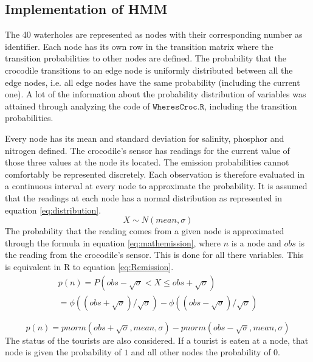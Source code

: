 \documentclass[12pt, a4paper]{article}
\begin{document}
\subsection{Implementation of HMM}\label{seq:implementation}

The 40 waterholes are represented as nodes with their corresponding number as identifier. Each node has its own row in the transition matrix where the transition probabilities to other nodes are defined. The probability that the crocodile transitions to an edge node is uniformly distributed between all the edge nodes, i.e. all edge nodes have the same probability (including the current one). A lot of the information about the probability distribution of variables was attained through analyzing the code of $ \mathtt{WheresCroc.R}$, including the transition probabilities.

Every node has its mean and standard deviation for salinity, phosphor and nitrogen defined. The crocodile's sensor has readings for the current value of those three values at the node its located. The emission probabilities cannot comfortably be represented discretely. Each observation is therefore evaluated in a continuous interval at every node to approximate the probability. It is assumed that the readings at each node has a normal distribution as represented in equation \ref{eq:distribution}.
\begin{equation}\label{eq:distribution}
X \sim N(mean,\sigma)
\end{equation}
The probability that the reading comes from a given node is approximated through the formula in equation \ref{eq:mathemission}, where $n$ is a node and $obs$ is the reading from the crocodile's sensor. This is done for all there variables. This is equivalent in R to equation \ref{eq:Remission}.
\begin{equation}\label{eq:mathemission}
\begin{split}
p(n) = P(obs-\sqrt{\sigma} < X \le obs+\sqrt{\sigma})
\\
=\phi((obs+\sqrt{\sigma})/\sqrt{\sigma})-\phi((obs-\sqrt{\sigma})/\sqrt{\sigma})%
\end{split}
\end{equation}

\begin{equation}\label{eq:Remission}
p(n) = pnorm(obs+\sqrt{\sigma},mean,\sigma)-pnorm(obs-\sqrt{\sigma},mean,\sigma)
\end{equation}
The status of the tourists are also considered. If a tourist is eaten at a node, that node is given the probability of $1$ and all other nodes the probability of $0$.
\end{document}
